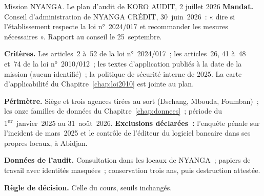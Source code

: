 \begin{boxscenario}{Mission NYANGA. Le plan d'audit de KORO AUDIT, 2 juillet 2026}
\textbf{Mandat.} Conseil d'administration de NYANGA CRÉDIT, 30~juin~2026~:
« dire si l'établissement respecte la loi n°~2024/017 et recommander les
mesures nécessaires ». Rapport au conseil le 25~septembre.

\textbf{Critères.} Les articles~2 à~52 de la loi n°~2024/017~; les
articles~26, 41 à~48 et~74 de la loi n°~2010/012~; les textes d'application
publiés à la date de la mission (aucun identifié)~; la politique de sécurité
interne de 2025. La carte d'applicabilité du Chapitre~\ref{chap:loi2010} est
jointe au plan.

\textbf{Périmètre.} Siège et trois agences tirées au sort (Dschang,
Mbouda, Foumban)~; les onze familles de données du
Chapitre~\ref{chap:donnees}~; période du 1\textsuperscript{er}~janvier~2025
au 31~août~2026. \textbf{Exclusions déclarées~:} l'enquête pénale sur
l'incident de mars~2025 et le contrôle de l'éditeur du logiciel bancaire
dans ses propres locaux, à Abidjan.

\textbf{Données de l'audit.} Consultation dans les locaux de NYANGA~;
papiers de travail avec identités masquées~; conservation trois ans, puis
destruction attestée.

\textbf{Règle de décision.} Celle du cours, seuils inchangés.
\end{boxscenario}

